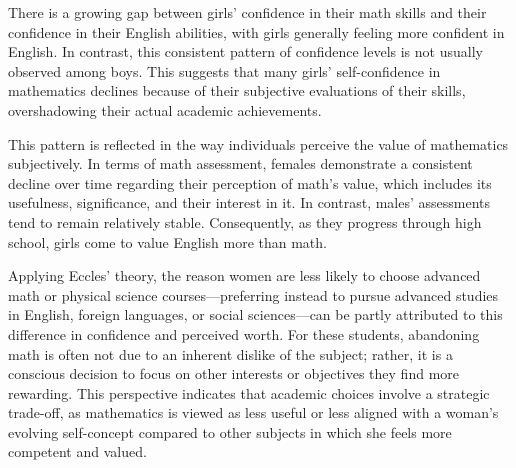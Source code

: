 There is a growing gap between girls' confidence in their math skills and their confidence in their English abilities, with girls generally feeling more confident in English. In contrast, this consistent pattern of confidence levels is not usually observed among boys. This suggests that many girls' self-confidence in mathematics declines because of their subjective evaluations of their skills, overshadowing their actual academic achievements.

This pattern is reflected in the way individuals perceive the value of mathematics subjectively. In terms of math assessment, females demonstrate a consistent decline over time regarding their perception of math's value, which includes its usefulness, significance, and their interest in it. In contrast, males’ assessments tend to remain relatively stable. Consequently, as they progress through high school, girls come to value English more than math. 

Applying Eccles' theory, the reason women are less likely to choose advanced math or physical science courses—preferring instead to pursue advanced studies in English, foreign languages, or social sciences—can be partly attributed to this difference in confidence and perceived worth. For these students, abandoning math is often not due to an inherent dislike of the subject; rather, it is a conscious decision to focus on other interests or objectives they find more rewarding. This perspective indicates that academic choices involve a strategic trade-off, as mathematics is viewed as less useful or less aligned with a woman's evolving self-concept compared to other subjects in which she feels more competent and valued.

